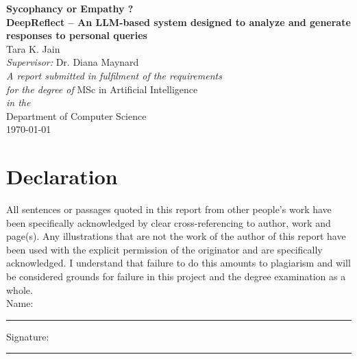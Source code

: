 \documentclass[11pt,oneside]{book}
\begin{document}
\frontmatter

\begin{titlepage}


\begin{center}
\linespread{1.2}\huge {\bfseries Sycophancy or Empathy ? \\ DeepReflect – An LLM-based system designed to analyze and generate responses to personal queries}\\[2cm]
\linespread{1}
{\Large Tara K. Jain}\\[1cm]
{\large \emph{Supervisor:} Dr. Diana Maynard}\\[1cm]
\large \emph{A report submitted in fulfilment of the requirements}\\ \emph{for the degree of} MSc in Artificial Intelligence\\[0.3cm] 
\textit{in the}\\[0.3cm]
Department of Computer Science\\[2cm]

\today
\end{center}

\end{titlepage}


\newpage
\chapter*{\Large Declaration}


All sentences or passages quoted in this report from other people's work have been specifically acknowledged by clear cross-referencing to author, work and page(s). Any illustrations that are not the work of the author of this report have been used with the explicit permission of the originator and are specifically acknowledged. I understand that failure to do this amounts to plagiarism and will be considered grounds for failure in this project and the degree examination as a whole.\\[1cm]

\noindent Name:\\[1mm]
\rule[1em]{25em}{0.5pt}

\noindent Signature:\\[1mm]
\rule[1em]{25em}{0.5pt}
\end{document}
